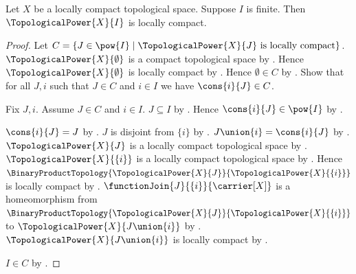 \begin{theorem}\label{finite_topological_power_is_locally_compact}
    Let $X$ be a locally compact topological space.
    Suppose $I$ is finite.
    Then $\TopologicalPower{X}{I}$ is locally compact.
\end{theorem}
\begin{proof}
    Let $C=\{J\in\pow{I}\mid\text{$\TopologicalPower{X}{J}$ is locally compact}\}$.
    $\TopologicalPower{X}{\emptyset}$ is a compact topological space by
        .
    Hence $\TopologicalPower{X}{\emptyset}$ is locally compact by
        .
    Hence $\emptyset\in C$ by .
    Show that for all $J,i$ such that $J\in C$ and $i\in I$ we have $\cons{i}{J}\in C$.
    \begin{subproof}
        Fix $J,i$.
        Assume $J\in C$ and $i\in I$.
        $J\subseteq I$ by .
        Hence $\cons{i}{J}\in\pow{I}$ by .
        \begin{byCase}
                $\cons{i}{J}=J$ by .
                $J$ is disjoint from $\{i\}$ by .
                $J\union\{i\}=\cons{i}{J}$ by .
                $\TopologicalPower{X}{J}$ is a locally compact topological space by
                    .
                $\TopologicalPower{X}{\{i\}}$ is a locally compact topological space by
                    .
                Hence $\BinaryProductTopology{\TopologicalPower{X}{J}}{\TopologicalPower{X}{\{i\}}}$
                    is locally compact by .
                $\functionJoin{J}{\{i\}}{\carrier[X]}$ is a homeomorphism from
                    $\BinaryProductTopology{\TopologicalPower{X}{J}}{\TopologicalPower{X}{\{i\}}}$
                    to $\TopologicalPower{X}{J\union\{i\}}$ by .
                $\TopologicalPower{X}{J\union\{i\}}$ is locally compact by
                    .
        \end{byCase}
    \end{subproof}
    $I\in C$ by .
\end{proof}
